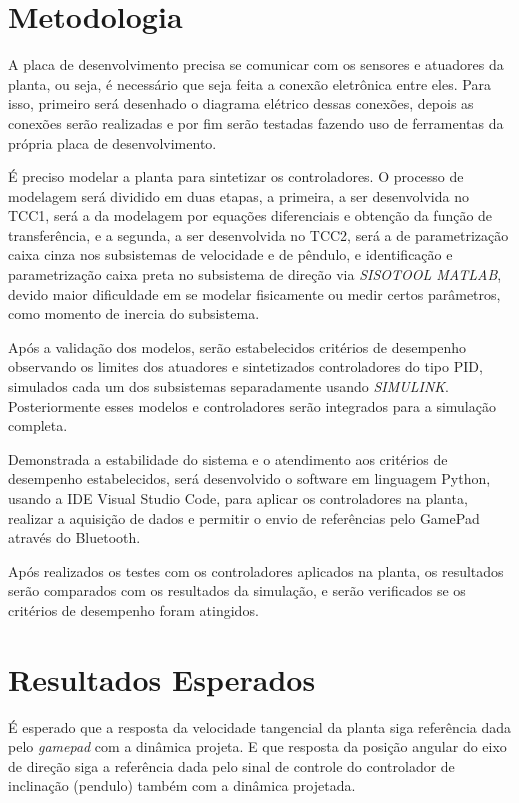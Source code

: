 \documentclass[conference,harvard,brazil,english]{sbatex}
\begin{document}
    \section{Metodologia}
        
        A placa de desenvolvimento precisa se comunicar com os sensores e atuadores da planta, ou seja, é necessário que seja feita a conexão eletrônica entre eles. Para isso, primeiro será desenhado o diagrama elétrico dessas conexões, depois as conexões serão realizadas e por fim serão testadas fazendo uso de ferramentas da própria placa de desenvolvimento.
        
        É preciso modelar a planta para sintetizar os controladores. O processo de modelagem será dividido em duas etapas, a primeira, a ser desenvolvida no TCC1, será a da modelagem por equações diferenciais e obtenção da função de transferência, e a segunda, a ser desenvolvida no TCC2, será a de parametrização caixa cinza nos subsistemas de velocidade e de pêndulo, e identificação e parametrização caixa preta no subsistema de direção via \textit{SISOTOOL MATLAB}, devido maior dificuldade em se modelar fisicamente ou medir certos parâmetros, como momento de inercia do subsistema.
        
        Após a validação dos modelos, serão estabelecidos critérios de desempenho observando os limites dos atuadores e sintetizados controladores do tipo PID, simulados cada um dos subsistemas separadamente usando \textit{SIMULINK}. Posteriormente esses modelos e controladores serão integrados para a simulação completa.
        
        Demonstrada a estabilidade do sistema e o atendimento aos critérios de desempenho estabelecidos, será desenvolvido o software em linguagem Python, usando a IDE Visual Studio Code, para aplicar os controladores na planta, realizar a aquisição de dados e permitir o envio de referências pelo GamePad através do Bluetooth.
        
        Após realizados os testes com os controladores aplicados na planta, os resultados serão comparados com os resultados da simulação, e serão verificados se os critérios de desempenho foram atingidos.
        
    \section{Resultados Esperados}
        
        É esperado que a resposta da velocidade tangencial da planta siga referência dada pelo \textit{gamepad} com a dinâmica projeta. E que resposta da posição angular do eixo de direção siga a referência dada pelo sinal de controle do controlador de inclinação (pendulo) também com a dinâmica projetada.
        
\end{document}
